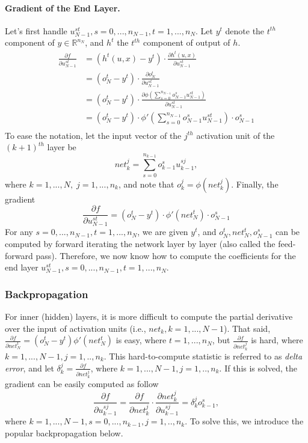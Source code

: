 \paragraph{Gradient of the End Layer.}
Let's first handle $u_{N-1}^{st}, s = 0,...,n_{N-1}, t = 1,...,n_N$.
Let $y^t$ denote the $t^{th}$ component of $y \in \mathbb{R}^{n_N}$, and $h^t$ the $t^{th}$ component of output of $h$.
\[\begin{aligned}
    \frac{\partial f}{\partial u_{N-1}^{st}}
    &= \left( h^t(u, x) - y^t \right) \cdot \frac{\partial h^t(u, x)}{\partial u_{N-1}^{st}} \\
    &= \left( o_N^t - y^t \right) \cdot \frac{\partial o_N^t}{\partial u_{N-1}^{st}} \\
    &= \left( o_N^t - y^t \right) \cdot \frac{\partial \phi \left( \sum_{s=0}^{n_{N-1}} o_{N-1}^s u_{N-1}^{st} \right)}{\partial u_{N-1}^{st}} \\
    &= \left( o_N^t - y^t \right) \cdot \phi' \left( \sum_{s=0}^{n_{N-1}} o_{N-1}^s u_{N-1}^{st} \right) \cdot o_{N-1}^s \\
\end{aligned}\]
To ease the notation, let the input vector of the $j^{th}$ activation unit of the $(k+1)^{th}$ layer be
\[\mathit{net}_k^j =\sum_{s=0}^{n_{k-1}} o_{k-1}^s u_{k-1}^{sj},\]
where $k = 1,...,N, \; j = 1,...,n_k$, and note that $o_k^j =\phi(\mathit{net}_k^j)$. Finally, the gradient
\[\frac{\partial f}{\partial u_{N-1}^{st}} = \left( o_N^t - y^t \right) \cdot \phi' ( \mathit{net}_N^t ) \cdot o_{N-1}^s\]
For any $s = 0,...,n_{N-1}, t =1,...,n_N$, we are given $y^t$, and $o_N^t, \mathit{net}_N^t, o_{N-1}^s$ can be computed by forward iterating the network layer by layer (also called the feed-forward pass). Therefore, we now know how to compute the coefficients for the end layer $u_{N-1}^{st}, s = 0,...,n_{N-1}, t =1,...,n_N$.

\subsubsection{Backpropagation}
For inner (hidden) layers, it is more difficult to compute the partial derivative over the input of activation units (i.e., $\mathit{net}_k, k = 1,...,N-1$).
That said, $\frac{\partial f}{\partial \mathit{net}_N^t} = (o_N^t - y^t) \phi'(\mathit{net}_N^t)$ is easy, where $t = 1,...,n_N$, but $\frac{\partial f}{\partial \mathit{net}_k^j}$ is hard, where $k = 1,...,N-1, j = 1,..,n_k$.
This hard-to-compute statistic is referred to as \textit{delta error}, and let $\delta_k^j = \frac{\partial f}{\partial \mathit{net}_k^j}$, where $k = 1,...,N-1, j = 1,..,n_k$.
If this is solved, the gradient can be easily computed as follow
\[\frac{\partial f}{\partial u_{k-1}^{sj}} = \boxed{\frac{\partial f}{\partial \mathit{net}_k^j}} \cdot \frac{\partial \mathit{net}_k^j}{\partial u_{k-1}^{sj}} = \boxed{\delta_k^j} o_{k-1}^s,\]
where $k = 1,...,N-1, s = 0,...,n_{k-1}, j = 1,..,n_k$.
To solve this, we introduce the popular backpropagation below.

